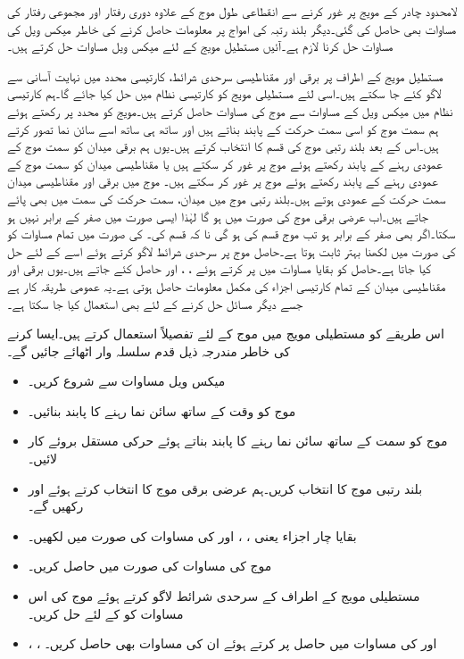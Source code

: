 لامحدود چادر کے مویج پر غور کرنے سے انقطاعی طول موج کے علاوہ دوری رفتار اور مجموعی رفتار کی مساوات بھی حاصل کی  گئی۔دیگر بلند رتبہ کی امواج پر معلومات حاصل کرنے کی خاطر میکس ویل کی مساوات حل کرنا لازم ہے۔آئیں  مستطیل مویج کے لئے میکس ویل مساوات حل کرتے ہیں۔

مستطیل مویج کے اطراف پر برقی اور مقناطیسی سرحدی شرائط، کارتیسی محدد میں نہایت آسانی سے لاگو کئے جا سکتے ہیں۔اسی لئے مستطیلی مویج کو کارتیسی نظام میں حل کیا جائے گا۔ہم کارتیسی نظام میں میکس ویل کے مساوات سے  موج کی مساوات حاصل کرتے ہیں۔مویج کو  محدد پر رکھتے ہوئے ہم سمت موج کو اسی سمت حرکت کے پابند بناتے ہیں اور ساتھ ہی ساتھ اسے سائن نما تصور کرتے ہیں۔اس کے بعد بلند رتبی موج کی قسم کا انتخاب کرتے ہیں۔یوں ہم برقی میدان  کو سمت موج کے عمودی رہنے کے پابند رکھتے ہوئے   موج پر غور کر سکتے ہیں یا مقناطیسی میدان کو سمت موج کے عمودی رہنے کے پابند رکھتے ہوئے   موج پر غور کر سکتے ہیں۔ موج میں برقی اور مقناطیسی میدان سمت حرکت کے عمودی ہوتے ہیں۔بلند رتبی موج میں میدان، سمت حرکت کی سمت میں بھی پائے جاتے ہیں۔اب عرضی برقی  موج کی صورت میں  ہو گا لہٰذا ایسی صورت میں  صفر کے برابر نہیں ہو سکتا۔اگر  بھی صفر کے برابر ہو تب موج  قسم کی ہو گی نا کہ  قسم کی۔ کی صورت میں تمام مساوات کو  کی صورت میں لکھنا بہتر ثابت ہوتا ہے۔حاصل موج پر سرحدی شرائط لاگو کرتے ہوئے اسے  کے لئے حل کیا جاتا ہے۔حاصل  کو بقایا مساوات میں پر کرتے ہوئے ، ،  اور  حاصل کئے جاتے ہیں۔یوں برقی اور مقناطیسی میدان کے تمام کارتیسی اجزاء کی مکمل معلومات حاصل ہوتی ہے۔یہ عمومی طریقہ کار ہے جسے دیگر مسائل حل کرنے کے لئے بھی استعمال کیا جا سکتا ہے۔

اس طریقے کو مستطیلی مویج میں  موج کے لئے تفصیلاً  استعمال کرتے ہیں۔ایسا کرنے کی خاطر مندرجہ ذیل قدم سلسلہ وار اٹھائے جائیں گے۔
\begin{itemize}\label{اقدام_مویج_آٹھ_قدم}
\item
میکس ویل مساوات سے شروع کریں۔
\item
موج کو وقت کے ساتھ سائن نما رہنے کا پابند بنائیں۔
\item
موج کو  سمت کے ساتھ سائن نما رہنے کا پابند بناتے ہوئے  حرکی مستقل بروئے کار لائیں۔
\item
بلند رتبی موج کا انتخاب کریں۔ہم  عرضی برقی  موج کا انتخاب کرتے ہوئے  اور  رکھیں گے۔
\item
بقایا چار اجزاء یعنی ، ،  اور  کی مساوات  کی صورت میں لکھیں۔
\item
موج کی مساوات  کی صورت میں حاصل کریں۔
\item
مستطیلی مویج کے اطراف کے سرحدی شرائط لاگو کرتے ہوئے موج کی اس مساوات کو  کے لئے حل کریں۔
\item
{}، ،  اور  کی مساوات میں حاصل  پر کرتے ہوئے ان کی مساوات بھی حاصل کریں۔
\end{itemize}  

